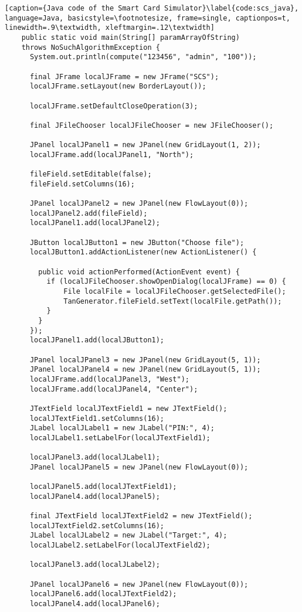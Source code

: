 \begin{lstlisting}[caption={Java code of the Smart Card Simulator}\label{code:scs_java}, language=Java, basicstyle=\footnotesize, frame=single, captionpos=t, linewidth=.9\textwidth, xleftmargin=.12\textwidth]
	public static void main(String[] paramArrayOfString)
	throws NoSuchAlgorithmException {
	  System.out.println(compute("123456", "admin", "100"));

	  final JFrame localJFrame = new JFrame("SCS");
	  localJFrame.setLayout(new BorderLayout());

	  localJFrame.setDefaultCloseOperation(3);

	  final JFileChooser localJFileChooser = new JFileChooser();

	  JPanel localJPanel1 = new JPanel(new GridLayout(1, 2));
	  localJFrame.add(localJPanel1, "North");

	  fileField.setEditable(false);
	  fileField.setColumns(16);

	  JPanel localJPanel2 = new JPanel(new FlowLayout(0));
	  localJPanel2.add(fileField);
	  localJPanel1.add(localJPanel2);

	  JButton localJButton1 = new JButton("Choose file");
	  localJButton1.addActionListener(new ActionListener() {

        public void actionPerformed(ActionEvent event) {
          if (localJFileChooser.showOpenDialog(localJFrame) == 0) {
              File localFile = localJFileChooser.getSelectedFile();
              TanGenerator.fileField.setText(localFile.getPath());
          }
        }
	  });
	  localJPanel1.add(localJButton1);

	  JPanel localJPanel3 = new JPanel(new GridLayout(5, 1));
	  JPanel localJPanel4 = new JPanel(new GridLayout(5, 1));
	  localJFrame.add(localJPanel3, "West");
	  localJFrame.add(localJPanel4, "Center");

	  JTextField localJTextField1 = new JTextField();
	  localJTextField1.setColumns(16);
	  JLabel localJLabel1 = new JLabel("PIN:", 4);
	  localJLabel1.setLabelFor(localJTextField1);

	  localJPanel3.add(localJLabel1);
	  JPanel localJPanel5 = new JPanel(new FlowLayout(0));

	  localJPanel5.add(localJTextField1);
	  localJPanel4.add(localJPanel5);

	  final JTextField localJTextField2 = new JTextField();
	  localJTextField2.setColumns(16);
	  JLabel localJLabel2 = new JLabel("Target:", 4);
	  localJLabel2.setLabelFor(localJTextField2);

	  localJPanel3.add(localJLabel2);

	  JPanel localJPanel6 = new JPanel(new FlowLayout(0));
	  localJPanel6.add(localJTextField2);
	  localJPanel4.add(localJPanel6);


\end{lstlisting}
